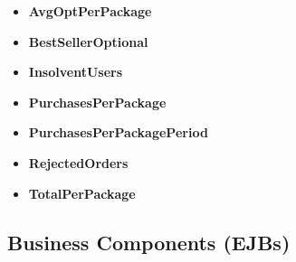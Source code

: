\begin{itemize}
    \item \textbf{AvgOptPerPackage}
    \item \textbf{BestSellerOptional}
    \item \textbf{InsolventUsers}
    \item \textbf{PurchasesPerPackage}
    \item \textbf{PurchasesPerPackagePeriod}
    \item \textbf{RejectedOrders}
    \item \textbf{TotalPerPackage}
\end{itemize}

\subsection{Business Components (EJBs)}


